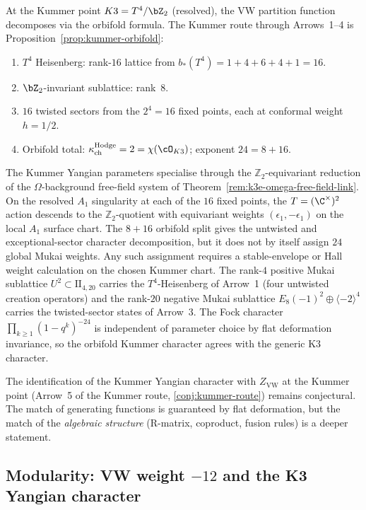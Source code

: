 At the Kummer point $K3 = T^4/\bZ_2$ (resolved), the VW partition function decomposes via the orbifold formula. The Kummer route through Arrows~1--4 is Proposition~\ref{prop:kummer-orbifold}:
\begin{enumerate}[label=\textbf{Arrow~\arabic*}:]
\item $T^4$ Heisenberg: rank-$16$ lattice from $b_\ast(T^4) = 1 + 4 + 6 + 4 + 1 = 16$.
\item $\bZ_2$-invariant sublattice: rank~$8$.
\item $16$ twisted sectors from the $2^4 = 16$ fixed points, each at conformal weight $h = 1/2$.
\item Orbifold total: $\kappa_{\mathrm{ch}}^{\mathrm{Hodge}} = 2 = \chi(\cO_{K3})$; exponent $24 = 8 + 16$.
\end{enumerate}
The Kummer Yangian parameters specialise through the
$\mathbb{Z}_2$-equivariant reduction of the $\Omega$-background
free-field system of
Theorem~\ref{rem:k3e-omega-free-field-link}. On the resolved $A_1$
singularity at each of the $16$ fixed points, the $T = (\C^\times)^2$
action descends to the $\mathbb{Z}_2$-quotient with equivariant weights
$(\epsilon_1, -\epsilon_1)$ on the local \(A_1\) surface chart.  The \(8+16\) orbifold split gives
the untwisted and exceptional-sector character decomposition, but it
does not by itself assign \(24\) global Mukai weights.  Any such
assignment requires a stable-envelope or Hall weight calculation on the
chosen Kummer chart. The rank-$4$ positive Mukai sublattice
\(U^2 \subset \mathrm{II}_{4, 20}\) carries the \(T^4\)-Heisenberg of
Arrow~1 (four untwisted creation operators) and the rank-$20$ negative
Mukai sublattice \(E_8(-1)^2 \oplus \langle -2\rangle^4\) carries the twisted-sector
states of Arrow~3. The Fock character
$\prod_{k \geq 1}(1 - q^k)^{-24}$ is independent of parameter choice
by flat deformation invariance, so the orbifold Kummer character
agrees with the generic K3 character.

\begin{remark}
\label{rem:k3e-kummer-yangian-agt}
The identification of the Kummer Yangian character with $Z_{\mathrm{VW}}$ at the Kummer point (Arrow~5 of the Kummer route, \ref{conj:kummer-route}) remains conjectural. The match of generating functions is guaranteed by flat deformation, but the match of the \emph{algebraic structure} (R-matrix, coproduct, fusion rules) is a deeper statement.
\end{remark}

\subsection{Modularity: VW weight \texorpdfstring{$-12$}{-12} and the K3 Yangian character}
\label{subsec:k3e-agt-modularity}

